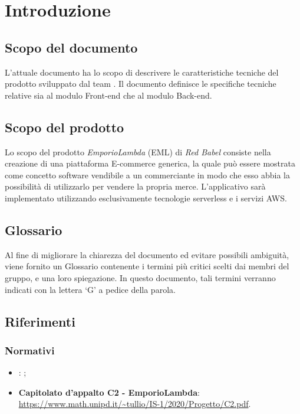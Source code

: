 \section{Introduzione}
\subsection{Scopo del documento}
L'attuale documento ha lo scopo di descrivere le caratteristiche tecniche del prodotto \nameproject{} sviluppato dal team \Omicron. Il documento definisce le specifiche tecniche relative sia al modulo Front-end che al modulo Back-end.
\subsection{Scopo del prodotto}
Lo scopo del prodotto \textit{EmporioLambda} (EML) di \textit{Red Babel} consiste nella creazione di una piattaforma E-commerce generica, la quale può essere mostrata come concetto software vendibile a un commerciante in modo che esso abbia la possibilità di utilizzarlo per vendere la propria merce. L'applicativo sarà implementato utilizzando esclusivamente tecnologie serverless e i servizi AWS.
\subsection{Glossario}
Al fine di migliorare la chiarezza del documento ed evitare possibili ambiguità, viene fornito un Glossario contenente i termini più critici scelti dai membri del gruppo, e una loro spiegazione. In questo documento, tali termini verranno indicati con la lettera `G' a pedice della parola.
\subsection{Riferimenti}
\subsubsection{Normativi}
\begin{itemize}
	\item \textbf{\NdP}: ;
	\item \textbf{Capitolato d'appalto C2 - EmporioLambda}: \\ \url{https://www.math.unipd.it/~tullio/IS-1/2020/Progetto/C2.pdf}.
\end{itemize}

